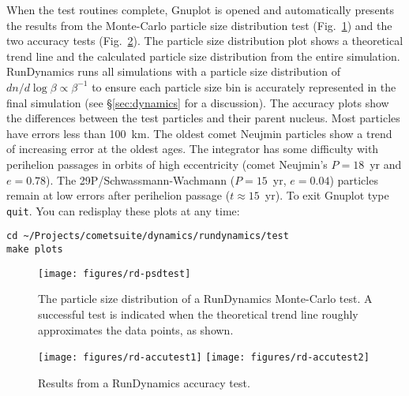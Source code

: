 \documentclass[12pt,letterpaper]{article}
\newcommand\rundynamics{RunDynamics}
\begin{document}
When the test routines complete, Gnuplot is opened and automatically
presents the results from the Monte-Carlo particle size distribution
test (Fig.~\ref{fig:rd-psdtest}) and the two accuracy tests
(Fig.~\ref{fig:rd-accutest}).  The particle size distribution plot
shows a theoretical trend line and the calculated particle size
distribution from the entire simulation.  \rundynamics{} runs all
simulations with a particle size distribution of $dn/d\log\beta
\propto \beta^{-1}$ to ensure each particle size bin is accurately
represented in the final simulation (see \S\ref{sec:dynamics} for a
discussion).  The accuracy plots show the differences between the test
particles and their parent nucleus.  Most particles have errors less
than 100~km.  The oldest comet Neujmin particles show a trend of
increasing error at the oldest ages.  The integrator has some
difficulty with perihelion passages in orbits of high eccentricity
(comet Neujmin's $P=18$~yr and $e=0.78$).  The
29P/Schwassmann-Wachmann ($P = 15$~yr, $e=0.04$) particles remain at
low errors after perihelion passage ($t\approx15$~yr).  To exit
Gnuplot type \texttt{quit}.  You can redisplay these plots at any
time:
\begin{lstlisting}
cd ~/Projects/cometsuite/dynamics/rundynamics/test
make plots
\end{lstlisting}


\begin{figure}
\center
\texttt{[image: figures/rd-psdtest]}
\caption[The particle size distribution of a \rundynamics{} Monte-Carlo
test.]{The particle size distribution of a \rundynamics{} Monte-Carlo
test.  A successful test is indicated when the theoretical trend line
roughly approximates the data points, as
shown. \label{fig:rd-psdtest}}
\end{figure}

\begin{figure}
\texttt{[image: figures/rd-accutest1]}
\texttt{[image: figures/rd-accutest2]}
\caption[Results from a \rundynamics{} accuracy test.]{Results from a
\rundynamics{} accuracy test. \label{fig:rd-accutest}}
\end{figure}
\end{document}
